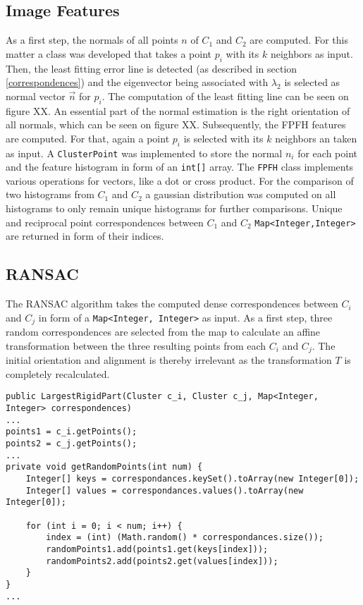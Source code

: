 \subsection{Image Features}
%
%
As a first step, the normals of all points $n$ of $C_1$ and $C_2$ are computed. For this matter a class was developed that takes a point $p_i$ with its $k$ neighbors as input. Then, the least fitting error line is detected (as described in section \ref{correspondences}) and the eigenvector being associated with $\lambda_2$ is selected as normal vector $\vec{n}$ for $p_i$. 
The computation of the least fitting line can be seen on figure XX.
An essential part of the normal estimation is the right orientation of all normals, which can be seen on figure XX.
Subsequently, the FPFH features are computed. For that, again a point $p_i$ is selected with its $k$ neighbors an taken as input. A \texttt{ClusterPoint} was implemented to store the normal $n_i$ for each point and the feature histogram in form of an \texttt{int[]} array. The \texttt{FPFH} class implements various operations for vectors, like a dot or cross product. For the comparison of two histograms from $C_1$ and $C_2$ a gaussian distribution was computed on all histograms to only remain unique histograms for further comparisons. Unique and reciprocal point correspondences between $C_1$ and $C_2$ \texttt{Map<Integer,Integer>} are returned  in form of their indices.


\subsection{RANSAC}
\label{RANSAC}
The RANSAC algorithm takes the computed dense correspondences between $C_i$ and $C_j$ in form of a \texttt{Map<Integer, Integer>} as input. As a first step, three random correspondences are selected from the map to calculate an affine transformation between the three resulting points from each $C_i$ and $C_j$. The initial orientation and alignment is thereby irrelevant as the transformation $T$ is completely recalculated.

\begin{lstlisting}
public LargestRigidPart(Cluster c_i, Cluster c_j, Map<Integer, Integer> correspondences)
...
points1 = c_i.getPoints();
points2 = c_j.getPoints();
...
private void getRandomPoints(int num) {
	Integer[] keys = correspondances.keySet().toArray(new Integer[0]);
	Integer[] values = correspondances.values().toArray(new Integer[0]);

	for (int i = 0; i < num; i++) {
		index = (int) (Math.random() * correspondances.size());
		randomPoints1.add(points1.get(keys[index]));
		randomPoints2.add(points2.get(values[index]));
	}
}
...
\end{lstlisting}

